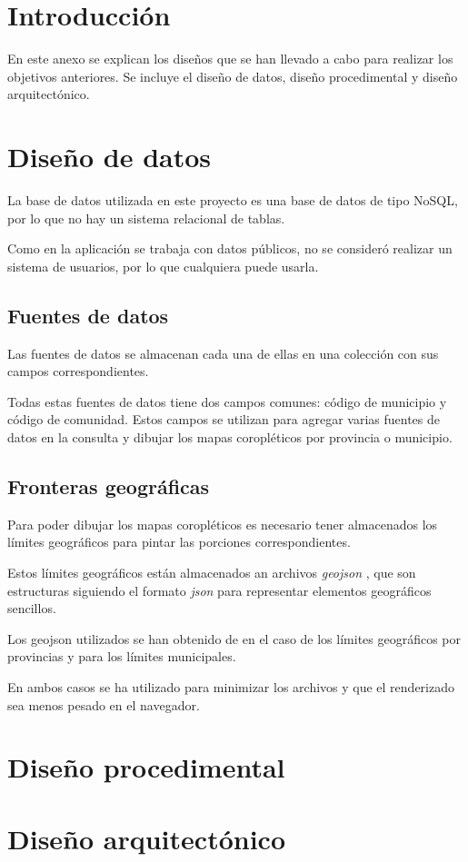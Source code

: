 
\section{Introducción}

En este anexo se explican los diseños que se han llevado a cabo para realizar los objetivos anteriores. Se incluye el diseño de datos, diseño procedimental y diseño arquitectónico.

\section{Diseño de datos}

La base de datos utilizada en este proyecto es una base de datos de tipo NoSQL, por lo que no hay un sistema relacional de tablas.

Como en la aplicación se trabaja con datos públicos, no se consideró realizar un sistema de usuarios, por lo que cualquiera puede usarla.

\subsection{Fuentes de datos}

Las fuentes de datos se almacenan cada una de ellas en una colección con sus campos correspondientes.

Todas estas fuentes de datos tiene dos campos comunes: código de municipio y código de comunidad. Estos campos se utilizan para agregar varias fuentes de datos en la consulta y dibujar los mapas coropléticos por provincia o municipio.


\subsection{Fronteras geográficas}

Para poder dibujar los mapas coropléticos es necesario tener almacenados los límites geográficos para pintar las porciones correspondientes.

Estos límites geográficos están almacenados an archivos \textit{geojson} \cite{misc:geojson}, que son estructuras siguiendo el formato \textit{json} para representar elementos geográficos sencillos.

Los geojson utilizados se han obtenido de \cite{misc:limitesmunicipales} en el caso de los límites geográficos por provincias y \cite{misc:carto} para los límites municipales.

En ambos casos se ha utilizado  \cite{misc:mapshaper} para minimizar los archivos y que el renderizado sea menos pesado en el navegador.

\section{Diseño procedimental}

\section{Diseño arquitectónico}


